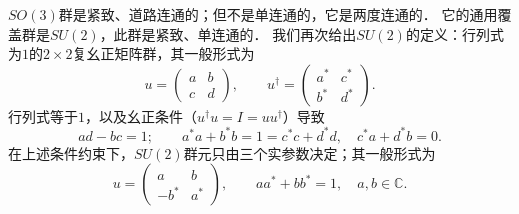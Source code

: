 $SO(3)$群是紧致、道路连通的；但不是单连通的，它是两度连通的．
它的通用覆盖群是$SU(2)$，此群是紧致、单连通的．
我们再次给出$SU(2)$的定义：行列式为$1$的$2\times 2$复幺正矩阵群，其一般形式为
\begin{equation}
    u = \begin{pmatrix}a & b \\ c & d \end{pmatrix}, \qquad
    u^\dagger = \begin{pmatrix}a^* & c^* \\ b^* & d^* \end{pmatrix} .
\end{equation}
行列式等于$1$，以及幺正条件（$u^\dagger u =I = u u^\dagger$）导致
\begin{equation}
    ad - bc =1 ; \qquad
    a^* a + b^* b =1=  c^* c+ d^* d , \quad c^* a + d^* b=0 .
\end{equation}
在上述条件约束下，$SU(2)$群元只由三个实参数决定；其一般形式为
\begin{equation}\label{chlar:eqn_SU2}
    u = \begin{pmatrix}a & b \\ -b^* & a^* \end{pmatrix}, \qquad
      a a^* + b b^* =1, \quad  a,b\in \mathbb{C} .
\end{equation}


